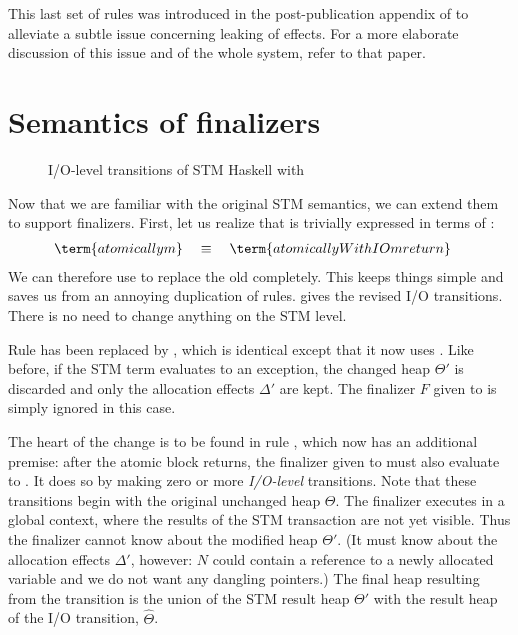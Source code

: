 This last set of rules was introduced in the post-publication appendix of \textcite{harris-et-al-2005} to alleviate a subtle issue concerning leaking of effects.
For a more elaborate discussion of this issue and of the whole system, refer to that paper.


\section{Semantics of finalizers}
\label{sec:stm-fin-semantics}

\begin{figure}

\caption{I/O-level transitions of STM Haskell with }
\label{fig:step1-io}
\end{figure}

Now that we are familiar with the original STM semantics, we can extend them to support finalizers.
First, let us realize that  is trivially expressed in terms of :
\begin{align*}
\term{atomically m} & \quad\equiv\quad \term{atomicallyWithIO m return}
\end{align*}
We can therefore use  to replace the old  completely.
This keeps things simple and saves us from an annoying duplication of rules.
 gives the revised I/O transitions.
There is no need to change anything on the STM level.

Rule  has been replaced by , which is identical except that it now uses .
Like before, if the STM term evaluates to an exception, the changed heap $\Theta'$ is discarded and only the allocation effects $\Delta'$ are kept.
The finalizer $F$ given to  is simply ignored in this case.

The heart of the change is to be found in rule , which now has an additional premise:
after the atomic block returns, the finalizer given to  must also evaluate to .
It does so by making zero or more \emph{I/O-level} transitions.
Note that these transitions begin with the original unchanged heap $\Theta$.
The finalizer executes in a global context, where the results of the STM transaction are not yet visible.
Thus the finalizer cannot know about the modified heap $\Theta'$.
(It must know about the allocation effects $\Delta'$, however:
$N$ could contain a reference to a newly allocated variable and we do not want any dangling pointers.)
The final heap resulting from the  transition is the union of the STM result heap $\Theta'$ with the result heap of the I/O transition, $\hat{\Theta}$.

